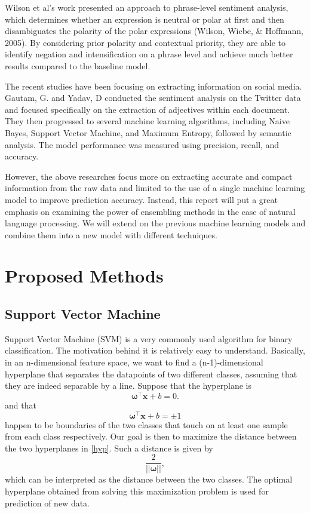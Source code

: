 \documentclass[10pt,twocolumn,letterpaper]{article}
\begin{document}
	Wilson et al’s work presented an approach to phrase-level sentiment analysis, which determines whether an expression is neutral or polar at first and then disambiguates the polarity of the polar expressions (Wilson, Wiebe, \& Hoffmann, 2005)\cite{wilson-etal-2005-recognizing}.  By considering prior polarity and contextual priority, they are able to identify negation and intensification on a phrase level and achieve much better results compared to the baseline model.
	
	The recent studies have been focusing on extracting information on social media. Gautam, G. and Yadav, D conducted the sentiment analysis on the Twitter data and focused specifically on the extraction of adjectives within each document\cite{6897213}. They then progressed to several machine learning algorithms, including Naive Bayes, Support Vector Machine, and Maximum Entropy, followed by semantic analysis. The model performance was measured using precision, recall, and accuracy.
	
	However, the above researches focus more on extracting accurate and compact information from the raw data and limited to the use of a single machine learning model to improve prediction accuracy. Instead, this report will put a great emphasis on examining the power of ensembling methods in the case of natural language processing. We will extend on the previous machine learning models and combine them into a new model with different techniques.
	
	\section{Proposed Methods}
	\subsection{Support Vector Machine}
	Support Vector Machine (SVM) is a very commonly used algorithm for binary classification. The motivation behind it is relatively easy to understand. Basically, in an n-dimensional feature space, we want to find a (n-1)-dimensional hyperplane that separates the datapoints of two different classes, assuming that they are indeed separable by a line. Suppose that the hyperplane is $$\bm{\omega}^\top \bm{x} + b = 0.$$ and that \begin{equation}
	\bm{\omega}^\top \bm{x} + b = \pm1 \label{hyp}
	\end{equation} happen to be boundaries of the two classes that touch on at least one sample from each class respectively. Our goal is then to maximize the distance between the two hyperplanes in \ref{hyp}. Such a distance is given by $$\frac{2}{||\bm{\omega}||},$$ which can be interpreted as the distance between the two classes. The optimal hyperplane obtained from solving this maximization problem is used for prediction of new data. 
	
\end{document}
